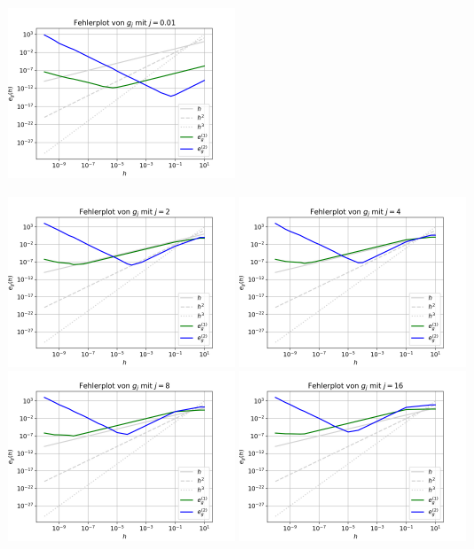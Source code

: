 \documentclass{scrartcl}
\begin{document}
{    \includegraphics[width=0.45\textwidth]{Grafiken/Fehlerplot_j001}\\
    \vspace{-0.2cm}

    \vspace{0.5cm}
    \includegraphics[width=0.45\textwidth]{Grafiken/Fehlerplot_j2}
    \includegraphics[width=0.45\textwidth]{Grafiken/Fehlerplot_j4}\\
    \includegraphics[width=0.45\textwidth]{Grafiken/Fehlerplot_j8}
    \includegraphics[width=0.45\textwidth]{Grafiken/Fehlerplot_j16}\\
    \vspace{-0.2cm}
    \vspace{0.5cm}
  }
\end{document}
